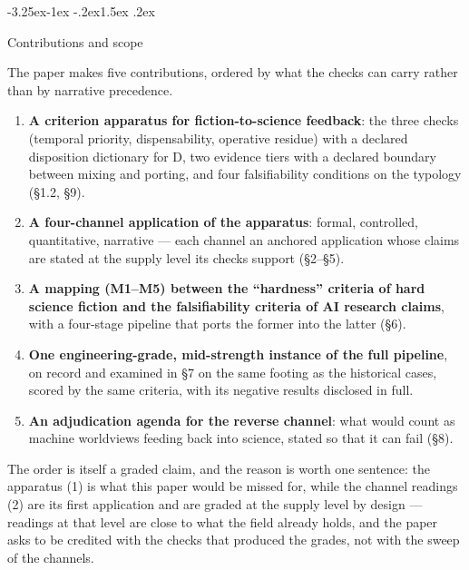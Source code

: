 \documentclass[11pt,a4paper]{article}
\makeatletter
\renewcommand\subsection{\@startsection{subsection}{2}{\z@}%
  {-3.25ex\@plus -1ex \@minus -.2ex}{1.5ex \@plus .2ex}%
  {\normalfont\large\bfseries\raggedright}}
\makeatother
\begin{document}
\subsection{Contributions and scope}

The paper makes five contributions, ordered by what the checks can carry rather than by narrative precedence.

\begin{enumerate}[leftmargin=1.6em,itemsep=2pt,parsep=0pt,topsep=3pt]
\item \textbf{A criterion apparatus for fiction-to-science feedback}: the three checks (temporal priority, dispensability, operative residue) with a declared disposition dictionary for D, two evidence tiers with a declared boundary between mixing and porting, and four falsifiability conditions on the typology (§1.2, §9).
\item \textbf{A four-channel application of the apparatus}: formal, controlled, quantitative, narrative — each channel an anchored application whose claims are stated at the supply level its checks support (§2–§5).
\item \textbf{A mapping (M1–M5) between the ``hardness'' criteria of hard science fiction and the falsifiability criteria of AI research claims}, with a four-stage pipeline that ports the former into the latter (§6).
\item \textbf{One engineering-grade, mid-strength instance of the full pipeline}, on record and examined in §7 on the same footing as the historical cases, scored by the same criteria, with its negative results disclosed in full.
\item \textbf{An adjudication agenda for the reverse channel}: what would count as machine worldviews feeding back into science, stated so that it can fail (§8).
\end{enumerate}

The order is itself a graded claim, and the reason is worth one sentence: the apparatus (1) is what this paper would be missed for, while the channel readings (2) are its first application and are graded at the supply level by design — readings at that level are close to what the field already holds, and the paper asks to be credited with the checks that produced the grades, not with the sweep of the channels.
\end{document}
